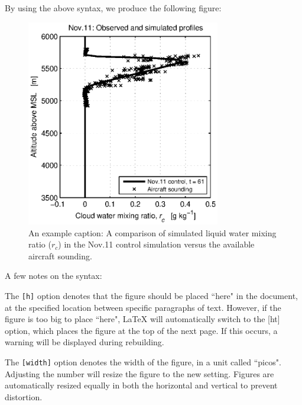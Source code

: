 \documentclass[master]{UWMThesis}
\begin{document}
By using the above syntax, we produce the following figure:

\begin{figure}[h]
 \centering
 \noindent\includegraphics[width=20pc]
    {./figures/nov11_sndg_qcm_compare_t61_bw.eps}
 \caption{An example caption: A comparison of simulated liquid water mixing ratio
          ($r_c$) in the Nov.11 control simulation versus the
          available aircraft sounding.}
 \label{fig:nov11_init_qcm}
\end{figure}

A few notes on the syntax:

The \verb=[h]= option denotes that the figure should be placed ``here" in the document, at the specified location between specific paragraphs of text.  However, if the figure is too big to place ``here", LaTeX will automatically switch to the [ht] option, which places the figure at the top of the next page.  If this occurs, a warning will be displayed during rebuilding.

The \verb=[width]= option denotes the width of the figure, in a unit called ``picos".  Adjusting the number will resize the figure to the new setting.  Figures are automatically resized equally in both the horizontal and vertical to prevent distortion.
\end{document}
